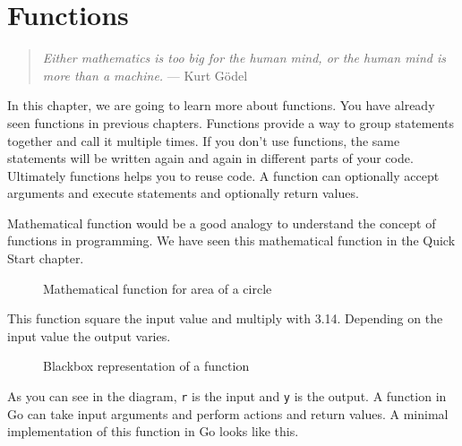 \cleardoublepage
{}
\chapter{Functions}

\begin{quote}
\textit{Either mathematics is too big for the human mind, or the human mind is
more than a machine.} --- Kurt Gödel
\end{quote}

In this chapter, we are going to learn more about functions.  You have
already seen functions in previous chapters.  Functions provide a way
to group statements together and call it multiple times.  If you don't
use functions, the same statements will be written again and again in
different parts of your code.  Ultimately functions helps you to reuse
code.  A function can optionally accept arguments and execute
statements and optionally return values.

Mathematical function would be a good analogy to understand the
concept of functions in programming.  We have seen this mathematical
function in the Quick Start chapter.

\begin{figure}[h!]
\centering
{}
\caption{Mathematical function for area of a circle}
\end{figure}

This function square the input value and multiply with 3.14.
Depending on the input value the output varies.

\begin{figure}[h!]
\centering
{}
\caption{Blackbox representation of a function}
\end{figure}

As you can see in the diagram, \texttt{r} is the input and \texttt{y}
is the output.  A function in Go can take input arguments and perform
actions and return values.  A minimal implementation of this function
in Go looks like this.

